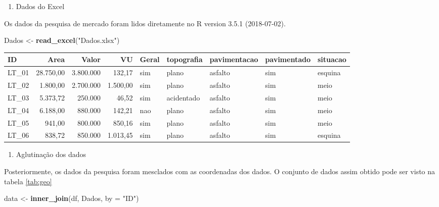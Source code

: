 \documentclass[]{article}
\newenvironment{Shaded}{\begin{snugshade}}{\end{snugshade}}
\newcommand{\KeywordTok}[1]{\textcolor[rgb]{0.13,0.29,0.53}{\textbf{#1}}}
\newcommand{\DataTypeTok}[1]{\textcolor[rgb]{0.13,0.29,0.53}{#1}}
\newcommand{\StringTok}[1]{\textcolor[rgb]{0.31,0.60,0.02}{#1}}
\newcommand{\NormalTok}[1]{#1}
\providecommand{\tightlist}{%
  \setlength{\itemsep}{0pt}\setlength{\parskip}{0pt}}
\begin{document}

\begin{enumerate}
\def\labelenumi{\alph{enumi}.}
\setcounter{enumi}{1}
\tightlist
\item
  Dados do Excel
\end{enumerate}

Os dados da pesquisa de mercado foram lidos diretamente no R version
3.5.1 (2018-07-02).

\begin{Shaded}
\begin{Highlighting}[]
\NormalTok{Dados <-}\StringTok{ }\KeywordTok{read_excel}\NormalTok{(}\StringTok{"Dados.xlsx"}\NormalTok{)}
\end{Highlighting}
\end{Shaded}

\begin{tabular}{lrrrlllll}
\toprule
ID & Area & Valor & VU & Geral & topografia & pavimentacao & pavimentado & situacao\\
\midrule
LT\_01 & 28.750,00 & 3.800.000 & 132,17 & sim & plano & asfalto & sim & esquina\\
LT\_02 & 1.800,00 & 2.700.000 & 1.500,00 & sim & plano & asfalto & sim & meio\\
LT\_03 & 5.373,72 & 250.000 & 46,52 & sim & acidentado & asfalto & sim & meio\\
LT\_04 & 6.188,00 & 880.000 & 142,21 & nao & plano & asfalto & sim & meio\\
LT\_05 & 941,00 & 800.000 & 850,16 & sim & plano & asfalto & sim & meio\\
LT\_06 & 838,72 & 850.000 & 1.013,45 & sim & plano & asfalto & sim & esquina\\
\bottomrule
\end{tabular}

\begin{enumerate}
\def\labelenumi{\alph{enumi}.}
\setcounter{enumi}{2}
\tightlist
\item
  Aglutinação dos dados
\end{enumerate}

Posteriormente, os dados da pesquisa foram mesclados com as coordenadas
dos dados. O conjunto de dados assim obtido pode ser visto na tabela
\ref{tab:geo}

\begin{Shaded}
\begin{Highlighting}[]
\NormalTok{data <-}\StringTok{ }\KeywordTok{inner_join}\NormalTok{(df, Dados, }\DataTypeTok{by =} \StringTok{"ID"}\NormalTok{)}
\end{Highlighting}
\end{Shaded}
\end{document}
